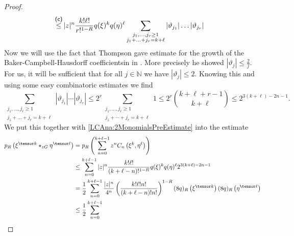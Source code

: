\begin{proof}
\begin{align}
        & \ot{(c)}{\leq}
        |z|^n
        \frac{k! \ell!}{r!^{1-R}}
        q(\xi)^k q(\eta)^{\ell}
        \sum\limits_{\substack{j_1, \ldots, j_r \geq 1 \\
            j_1 + \ldots + j_r = k + \ell}}
        |\vartheta_{j_1}| \ldots |\vartheta_{j_r}|
    \end{align}
    Now we will use the fact that Thompson gave estimate for the growth 
    of the Baker-Campbell-Hausdorff coefficientsin in 
    \cite{Thompson:Convergence:1989}. More precisely he showed 
    $|\vartheta_j| \leq \frac{2}{j}$. For us, it will be sufficient that 
    for all $j \in \mathbb{N}$ we have $|\vartheta_j| \leq 2$. Knowing this 
    and using some easy combinatoric estimates we find
    \begin{equation*}
        \sum\limits_{
          \substack{
            j_1, \ldots, j_r \geq 1 \\
            j_1 + \ldots + j_r = k + \ell
          }
        }
        |\vartheta_{j_1}| \cdots |\vartheta_{j_r}|
        \leq
        2^r \sum\limits_{
          \substack
          {j_1, \ldots, j_r \geq 1 \\
            j_1 + \cdots + j_r = k + \ell
          }
        } 1
        \leq
        2^r \binom{k + \ell + r - 1}{k + \ell}
        \leq
        2^{3 (k + \ell) - 2n - 1}.
    \end{equation*}
    We put this together with \eqref{LCAna:2MonomialsPreEstimate}
    into the estimate
    \begin{align}
        \nonumber
        p_R \left(
            \xi^{\tensor k} \ostar_{zG} \eta^{\tensor \ell}
        \right)
        & =
        p_R \left(
            \sum\limits_{n=0}^{k + \ell - 1}
            z^n
            C_n \left( \xi^k, \eta^{\ell} \right)
        \right)
        \\
        \nonumber
        & \leq
        \sum\limits_{n=0}^{k + \ell - 1}
        |z|^n
        \frac{k! \ell!}{(k + \ell - n)!^{1-R}}
        q(\xi)^k q(\eta)^{\ell}
        2^{3 (k + \ell) - 2 n - 1}
        \\
        \nonumber
        & =
        \frac{1}{2}
        \sum\limits_{n=0}^{k + \ell - 1}
        \frac{|z|^n}{4^n}
        \left( \frac{k! \ell! n!}{(k + \ell - n)! n!}
        \right)^{1-R}
        (8 q)_R \left( \xi^{\tensor k} \right)
        (8 q)_R \left( \eta^{\tensor \ell} \right)
        \\
        \label{LCAna:2MonomialEstimate}
        & \leq
        \frac{1}{2}
        \sum\limits_{n=0}^{k + \ell - 1}

\end{align}
\end{proof}
